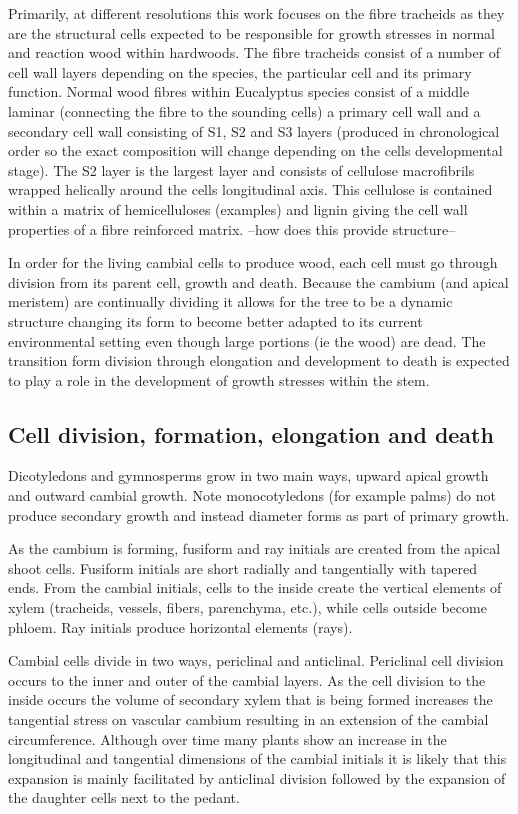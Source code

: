 \documentclass{article}
\begin{document}
Primarily, at different resolutions this work focuses on the fibre tracheids as
they are the structural cells expected to be responsible for growth stresses in
normal and reaction wood within hardwoods. The fibre tracheids consist of a
number of cell wall layers depending on the species, the particular cell and
its primary function. Normal wood fibres within Eucalyptus species
consist of a middle laminar (connecting the fibre to the sounding cells) a
primary cell wall and a secondary cell wall consisting of S1, S2 and S3 layers
(produced in chronological order so the exact composition will change depending
on the cells developmental stage). The S2 layer is the largest layer and
consists of cellulose macrofibrils wrapped helically around the cells
longitudinal axis. This cellulose is contained within a matrix of hemicelluloses (examples)
and lignin giving the cell wall properties of a fibre reinforced matrix. --how
does this provide structure--

In order for the living cambial cells to produce wood, each cell must go
through division from its parent cell, growth and death. Because the
cambium (and apical meristem) are continually dividing it allows for the tree to
be a dynamic structure changing its form to become better adapted to its current environmental
setting even though large portions (ie the wood) are dead. The transition form
division through elongation and development to death is expected to play a role
in the development of growth stresses within the stem.

\subsection{Cell division, formation, elongation and death}
Dicotyledons and gymnosperms grow in two main ways, upward apical growth and
outward cambial growth. Note monocotyledons (for example palms) do not produce
secondary growth and instead diameter forms as part of primary growth.

As the cambium is forming, fusiform and ray initials are created from the
apical shoot cells. Fusiform initials are short radially and tangentially with
tapered ends. From the cambial initials, cells to the inside create the vertical
elements of xylem (tracheids, vessels, fibers, parenchyma, etc.), while cells outside become phloem.
Ray initials produce horizontal elements (rays).

Cambial cells divide in two ways, periclinal and anticlinal.
Periclinal cell division occurs to the inner and outer of the cambial layers.
As the cell division to the inside occurs the volume of secondary xylem that is being
formed increases the tangential stress on vascular cambium resulting in an
extension of the cambial circumference. Although over time many plants show an
increase in the longitudinal and tangential dimensions of the cambial initials it is
likely that this expansion is mainly facilitated by anticlinal division followed
by the expansion of the daughter cells next to the pedant.
\end{document}
